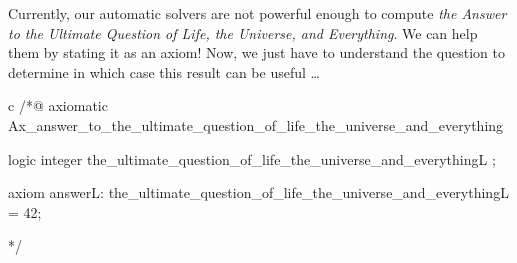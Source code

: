 










Currently, our automatic solvers are not
powerful enough to compute \emph{the Answer to the Ultimate
  Question of Life, the Universe, and Everything}. We can help
them by stating it as an axiom! Now, we just have to 
understand the question to determine in which case this result can be
useful \ldots{}


\begin{CodeBlock}{c}
/*@
  axiomatic Ax_answer_to_the_ultimate_question_of_life_the_universe_and_everything {
    logic integer the_ultimate_question_of_life_the_universe_and_everything{L} ;

    axiom answer{L}:
      the_ultimate_question_of_life_the_universe_and_everything{L} = 42;
  }
*/
\end{CodeBlock}




